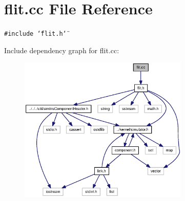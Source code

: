 \section{flit.cc File Reference}
\label{flit_8cc}
{\tt \#include \char`\"{}flit.h\char`\"{}}\par


Include dependency graph for flit.cc:\nopagebreak
\begin{figure}[H]
\begin{center}
\leavevmode
\includegraphics[width=229pt]{flit_8cc__incl}
\end{center}
\end{figure}
